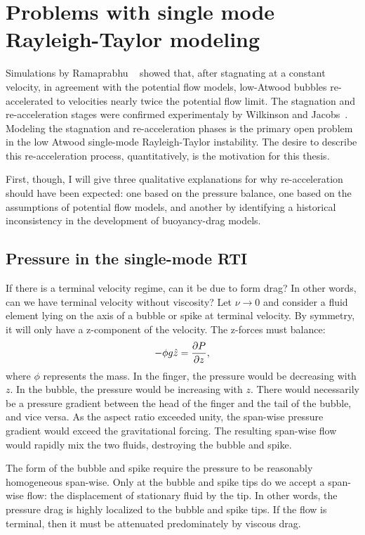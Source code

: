 \section{Problems with single mode Rayleigh-Taylor modeling}

Simulations by Ramaprabhu \etal ~\cite{Ramaprabhu2006} showed that, after stagnating at a constant velocity, in agreement with the potential flow models, low-Atwood bubbles re-accelerated to velocities nearly twice the potential flow limit.
The stagnation and re-acceleration stages were confirmed experimentaly by Wilkinson and Jacobs~\cite{Wilkinson2007}.
Modeling the stagnation and re-acceleration phases is the primary open problem in the low Atwood single-mode Rayleigh-Taylor instability.
The desire to describe this re-acceleration process, quantitatively, is the motivation for this thesis.

First, though, I will give three qualitative explanations for why re-acceleration should have been expected: one based on the pressure balance, one based on the assumptions of potential flow models, and another by identifying a historical inconsistency in the development of buoyancy-drag models.

\subsection{Pressure in the single-mode RTI}

If there is a terminal velocity regime, can it be due to form drag?
In other words, can we have terminal velocity without viscosity?
Let $\nu \rightarrow 0$ and consider a fluid element lying on the axis
of a bubble or spike at terminal velocity.
By symmetry, it will only have a z-component of the velocity.
The z-forces must balance:
\begin{equation}
- \phi g \hat{z} = \frac{\partial P}{\partial z} ,
\end{equation}
where $\phi$ represents the mass.
In the finger, the pressure would be decreasing with $z$.
In the bubble, the pressure would be increasing with $z$.
There would necessarily be a pressure gradient between the head of the finger and the tail of the bubble, and vice versa.
As the aspect ratio exceeded unity, the span-wise pressure gradient would exceed the gravitational forcing.
The resulting span-wise flow would rapidly mix the two fluids, destroying the bubble and spike.

The form of the bubble and spike require the pressure to be reasonably homogeneous span-wise.
Only at the bubble and spike tips do we accept a span-wise flow: the displacement of stationary fluid by the tip.
In other words, the pressure drag is highly localized to the bubble and spike tips.
If the flow is terminal, then it must be attenuated predominately by viscous drag.

